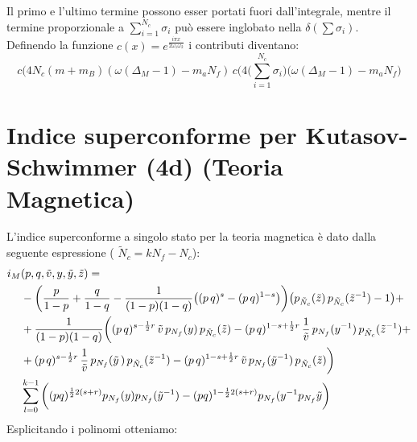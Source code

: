 \documentclass[a4paper,12pt]{report}
\begin{document}
Il primo e l'ultimo termine possono esser portati fuori dall'integrale, mentre il termine proporzionale a $ \sum_{i=1}^{N_c}	\sigma_i  $ può essere inglobato nella $\delta( \sum \sigma_i)$.\\
Definendo la funzione $ c(x) = e^{ \frac{i \pi x }{2 \omega_1 \omega_2}}$ i contributi diventano:
$$
c( 4 N_c  ( m  + m_B ) ( \omega (\Delta_M - 1) -  m_a N_f )\,  c( 4\big( \sum_{i=1}^{N_c}	 \sigma_i  \big) \big (\omega (\Delta_M - 1) -  m_a N_f \big)
$$

\section{Indice superconforme per Kutasov-Schwimmer (4d) (Teoria Magnetica) }

L'indice superconforme a singolo stato per la teoria magnetica è dato dalla seguente espressione ( $\tilde N_c = k N_f - N_c$):
\begin{align*}
 i_M &(p,q, \tilde v, y,\tilde y ,\tilde z) =  \\ 
& -\bigg({p \over 1-p}+{q \over 1-q} -{1 \over (1-p)(1-q)} \big((p\,q)^{s}- (p\,q)^{1-s}\big)
\bigg) \big( p_{\tilde N_c}( \tilde z)\, p_{\tilde N_c}(\tilde z^{-1})-1\big ) + \\ 
& +{1\over (1-p)(1-q)}\bigg((p\,q)^{s - {1\over 2}r} \,\tilde v \, p_{N_f}(y)\, p_{\tilde N_c}(\tilde z)
- (p\,q)^{1- s + {1\over 2}r} \, {1 \over \tilde v}\, p_{{N_f}}(y^{-1})\, p_{{\tilde N_c}}(\tilde z^{-1}) + \\
& + (p\,q)^{s - {1\over 2}r}\, {1\over \tilde v}\, p_{{N_f}}({\tilde y}\,) \, p_{{\tilde N_c}}(\tilde z^{-1})
- (p\,q)^{1- s +  {1\over 2}r} \, \tilde v \, p_{N_f}({\tilde y}^{-1})\, p_{\tilde N_c}(\tilde z)\bigg) \,\\
&\sum_{l=0}^{k-1}   \bigg( (pq)^{ {1 \over 2 } 2 ( s +r )} p_{N_f}(y) p_{N_f}(\tilde y^{-1}) - (pq)^{1 -  {1 \over 2 } 2 ( s +r )} p_{N_f}(y^{-1} p_{N_f}{\tilde y}\bigg)  \\
\end{align*}
Esplicitando i polinomi otteniamo:
\end{document}
